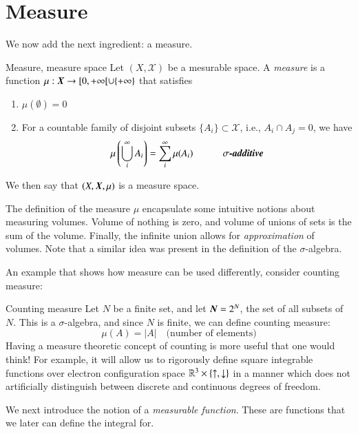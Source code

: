 \section{Measure}

We now add the next ingredient: a measure.
\begin{myDefinition}{Measure, measure space}{}
Let $(X,\mathcal{X})$ be a mesurable space. A \emph{measure} is a function $\mu : \boldsymbol{X} \to [0,+\infty[ \cup \{+\infty\}$ that satisfies
\begin{enumerate}
    \item $\mu(\emptyset) = 0$
    \item For a countable family of disjoint subsets $\{A_i\}\subset \mathcal{X}$, i.e., $A_i\cap A_j = 0$, we have
    \begin{equation}
        \mu\left(\bigcup_i^\infty A_i\right) = \sum_i^\infty \mu(A_i) \text{\axiomname{$\sigma$-additive}}
    \end{equation}
\end{enumerate}
We then say that $(X,\boldsymbol{X},\mu)$ is a measure space.
\end{myDefinition}

The definition of the measure $\mu$ encapsulate some intuitive notions about measuring volumes. Volume of nothing is zero, and volume of unions of sets is the sum of the volume. Finally, the infinite union allows for \emph{approximation} of volumes. Note that a similar idea was present in the definition of the $\sigma$-algebra.

An example that shows how measure can be used differently, consider counting measure:
\begin{myExample}{Counting measure}{}
    Let $N$ be a finite set, and let $\boldsymbol{N} = 2^N$, the set of all subsets of $N$. This is a $\sigma$-algebra, and since $N$ is finite, we can define counting measure:
    \begin{equation}
        \mu(A) = |A| \quad \text{(number of elements)}
    \end{equation}
    Having a measure theoretic concept of counting is more useful that one would think! For example, it will allow us to rigorously define square integrable functions over electron configuration space $\mathbb{R}^3 \times \{ \uparrow, \downarrow\}$ in a manner which does not artificially distinguish between discrete and continuous degrees of freedom.
\end{myExample}
We next introduce the notion of  a \emph{measurable function}. These are functions that we later can define the integral for.

